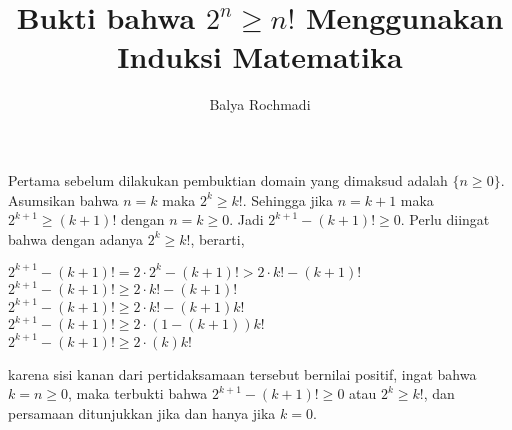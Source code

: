 \documentclass[14pt,a4paper]{article}
\title{Bukti bahwa $2^n \geq n!$ Menggunakan Induksi Matematika}
\author{Balya Rochmadi}
\begin{document}
	\maketitle
	Pertama sebelum dilakukan pembuktian domain yang dimaksud adalah $\{n \geq 0\}$.
	Asumsikan bahwa $n=k$ maka $2^k \geq k!$. Sehingga jika $n=k+1$ maka $2^{k+1}\geq (k+1)!$ dengan $n=k\geq 0$. Jadi $2^{k+1}-(k+1)!\geq 0 $. Perlu diingat bahwa dengan adanya $2^k \geq k!$, berarti,\\
\begin{center}
$2^{k+1}-(k+1)!=2\cdot2^k-(k+1)! > 2\cdot k!-(k+1)!$\medskip \\
$2^{k+1}-(k+1)!\geq 2\cdot k!-(k+1)!$\medskip \\
$2^{k+1}-(k+1)!\geq 2\cdot k!-(k+1)k!$\medskip \\
$2^{k+1}-(k+1)!\geq 2\cdot (1-(k+1))k!$\medskip \\
$2^{k+1}-(k+1)!\geq 2\cdot (k)k!$\medskip \\
\end{center}
karena sisi kanan dari pertidaksamaan tersebut bernilai positif, ingat bahwa $k=n\geq  0$, maka terbukti bahwa $2^{k+1}-(k+1)!\geq 0 $ atau $2^k \geq k!$, dan persamaan ditunjukkan jika dan hanya jika $k=0$. 	  						
	  						
\end{document}
